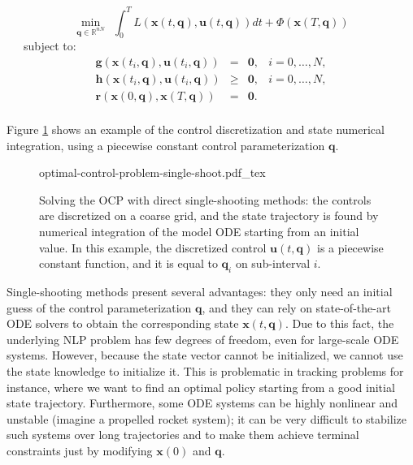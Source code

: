 \begin{equation}
  \min_{\mathbf{q}\in\mathbb R^{nN}} \ \ \int_{0}^{T}L (\mathbf{x}(t,\mathbf{q}),
  \mathbf{u}(t,\mathbf{q}))dt + \Phi(\mathbf{x}(T,\mathbf{q}))
\end{equation}
\ \ \ subject to:
\begin{equation}
  \begin{array}{rclr}
  \mathbf{g}(\mathbf{x}(t_i,\mathbf{q}), \mathbf{u}(t_i,\mathbf{q})) & = & \mathbf{0}, & i=0,\ldots,N,%
  \\%
  \mathbf{h}(\mathbf{x}(t_i,\mathbf{q}), \mathbf{u}(t_i,\mathbf{q})) & \ge & \mathbf{0}, & i=0,\ldots,N,%
  \\%
  \mathbf{r} (\mathbf{x}(0,\mathbf{q}), \mathbf{x}(T,\mathbf{q})) & = & \mathbf{0}.%
  \\%
  \end{array}
\end{equation} 

Figure \ref{fig:chap3-optimal-control-problem-single-shoot} shows an
example of the control discretization and state numerical integration,
using a piecewise constant control parameterization $\mathbf{q}$.

\begin{figure}
  \centering
      {\def\svgwidth{0.9\linewidth}
        
                   {optimal-control-problem-single-shoot.pdf_tex}
      }
      \caption{Solving the OCP with direct single-shooting methods:
        the controls are discretized on a coarse grid, and the state
        trajectory is found by numerical integration of the model ODE
        starting from an initial value. In this example, the
        discretized control $\mathbf{u}(t,\mathbf{q})$ is a piecewise
        constant function, and it is equal to $\mathbf{q}_i$ on
        sub-interval $i$.}
      \label{fig:chap3-optimal-control-problem-single-shoot}
\end{figure}

Single-shooting methods present several advantages: they only need an
initial guess of the control parameterization $\mathbf{q}$, and they
can rely on state-of-the-art ODE solvers to obtain the corresponding
state $\mathbf{x}(t,\mathbf{q})$. Due to this fact, the underlying NLP
problem has few degrees of freedom, even for large-scale ODE
systems. However, because the state vector cannot be initialized, we
cannot use the state knowledge to initialize it. This is problematic
in tracking problems for instance, where we want to find an optimal
policy starting from a good initial state trajectory. Furthermore,
some ODE systems can be highly nonlinear and unstable (imagine a
propelled rocket system); it can be very difficult to stabilize such
systems over long trajectories and to make them achieve terminal
constraints just by modifying $\mathbf{x}(0)$ and $\mathbf{q}$.

